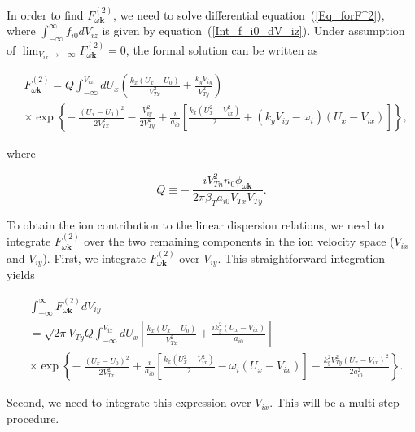 \documentclass[draft]{agujournal2019}
\renewcommand{\vec}{\mathbf}
\begin{document}
{In order to find $F_{\omega\vec{k}}^{(2)}$, we need to solve differential
equation~(\ref{Eq_forF^2}), where $\int_{-\infty}^{\infty}f_{i0}dV_{iz}$ is
given by equation~(\ref{Int_f_i0_dV_iz}). Under assumption of $\lim
_{V_{ix}\rightarrow-\infty}F_{\omega\vec{k}}^{(2)}=0$, the formal solution can
be written as
\begin{linenomath*}
\begin{align}
&  F_{\omega\vec{k}}^{(2)}=Q\int_{-\infty}^{V_{ix}}dU_{x}\left(  \frac
{k_{x}(U_{x}-U_{0})}{V_{Tx}^{2}}+\frac{k_{y}V_{iy}}{V_{Ty}^{2}%
}\right) \nonumber\\
&  \times\exp\left\{  -~\frac{(U_{x}-U_{0})^{2}}{2V_{Tx}^{2}}%
-\frac{V_{iy}^{2}}{2V_{Ty}^{2}}+\frac{i}{a_{i0}}\left[  \frac{k_{x}\left(
U_{x}^{2}-V_{ix}^{2}\right)  }{2}+(k_{y}V_{iy}-\omega_{i})\left(  U_{x}%
-V_{ix}\right)  \right]  \right\}  , 
\label{F^2_solution}%
\end{align}
\end{linenomath*}
where
\begin{linenomath*}
\begin{equation}
Q\equiv-\ \frac{iV_{Tn}^{2}n_{0}\phi_{\omega\vec{k}}}{2\pi\beta_{T}%
a_{i0}V_{Tx}V_{Ty}}. 
\label{Q}
\end{equation}
\end{linenomath*}
To obtain the ion contribution to the linear dispersion relations, we need to
integrate $F_{\omega\vec{k}}^{(2)}$ over the two remaining components in the
ion velocity space ($V_{ix}$ and $V_{iy}$). First, we integrate $F_{\omega
\vec{k}}^{(2)}$ over $V_{iy}$. This straightforward integration yields
\begin{linenomath*}
\begin{align}
&  \int_{-\infty}^{\infty}F_{\omega\vec{k}}^{(2)}dV_{iy}\nonumber\\
&  =\sqrt{2\pi}V_{Ty}Q\int_{-\infty}^{V_{ix}}dU_{x}\left[  \frac{k_{x}%
(U_{x}-U_{0})}{V_{Tx}^{2}}+\frac{ik_{y}^{2}\left(  U_{x}-V_{ix}\right)
}{a_{i0}}\right] \label{Integration_over_V_y}\\
&  \times\exp\left\{  -~\frac{(U_{x}-U_{0})^{2}}{2V_{Tx}^{2}}+\frac
{i}{a_{i0}}\left[  \frac{k_{x}\left(  U_{x}^{2}-V_{ix}^{2}\right)  }{2}%
-\omega_{i}\left(  U_{x}-V_{ix}\right)  \right]  -\frac{k_{y}^{2}V_{Ty}%
^{2}\left(  U_{x}-V_{ix}\right)  ^{2}}{2a_{i0}^{2}}\right\}  .\nonumber
\end{align}
\end{linenomath*}
Second, we need to integrate this expression over $V_{ix}$. This will be a
multi-step procedure.

}
\end{document}
